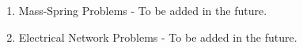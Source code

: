 \begin{multicols}{2}
\begin{enumerate}
\item Mass-Spring Problems - To be added in the future.


\item Electrical Network Problems - To be added in the future.

\end{enumerate}
\end{multicols}


\restoregeometry
